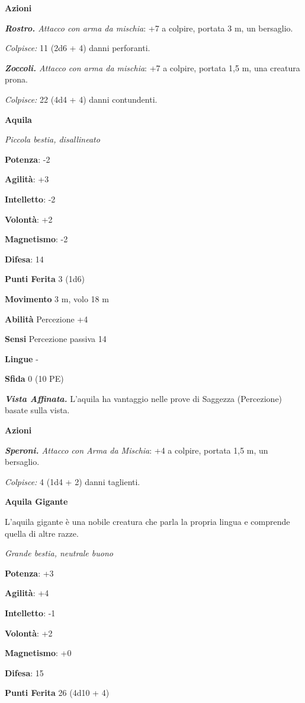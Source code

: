 \begin{multicols}{2}
\textbf{Azioni}

\emph{\textbf{Rostro.} Attacco con arma da mischia}: +7 a colpire,
portata 3 m, un bersaglio.

\emph{Colpisce:} 11 (2d6 + 4) danni perforanti.

\emph{\textbf{Zoccoli.} Attacco con arma da mischia}: +7 a colpire,
portata 1,5 m, una creatura prona.

\emph{Colpisce:} 22 (4d4 + 4) danni contundenti.

\textbf{Aquila}

\emph{Piccola bestia, disallineato}

\textbf{Potenza}: -2

\textbf{Agilità}: +3

\textbf{Intelletto}: -2

\textbf{Volontà}: +2

\textbf{Magnetismo}: -2

\textbf{Difesa}: 14

\textbf{Punti Ferita} 3 (1d6)

\textbf{Movimento} 3 m, volo 18 m

\textbf{Abilità} Percezione +4

\textbf{Sensi} Percezione passiva 14

\textbf{Lingue} -

\textbf{Sfida} 0 (10 PE)

\emph{\textbf{Vista Affinata.}} L'aquila ha vantaggio nelle prove di
Saggezza (Percezione) basate sulla vista.

\textbf{Azioni}

\emph{\textbf{Speroni.} Attacco con Arma da Mischia}: +4 a colpire,
portata 1,5 m, un bersaglio.

\emph{Colpisce:} 4 (1d4 + 2) danni taglienti.

\textbf{Aquila Gigante}

L'aquila gigante è una nobile creatura che parla la propria lingua e
comprende quella di altre razze.

\emph{Grande bestia, neutrale buono}

\textbf{Potenza}: +3

\textbf{Agilità}: +4

\textbf{Intelletto}: -1

\textbf{Volontà}: +2

\textbf{Magnetismo}: +0

\textbf{Difesa}: 15

\textbf{Punti Ferita} 26 (4d10 + 4)


\end{multicols}
